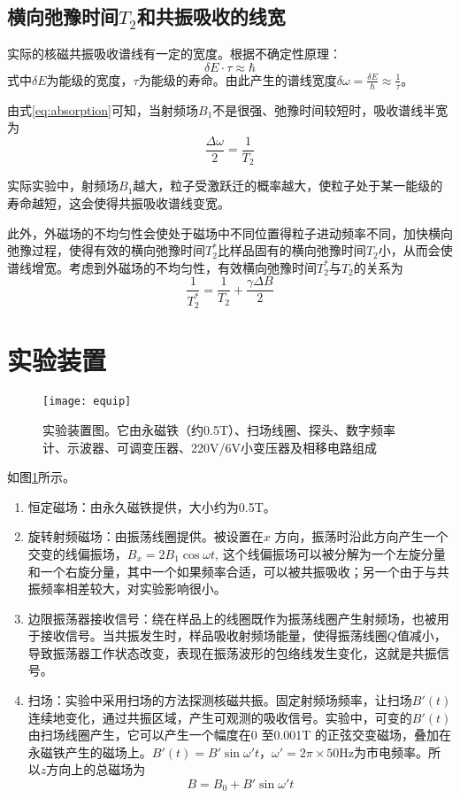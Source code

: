 \documentclass[aps,pre,12pt,preprint,onecolumn,showpacs,showkeys]{revtex4-1}
\begin{document}
\subsection{横向弛豫时间$T_2$和共振吸收的线宽}
实际的核磁共振吸收谱线有一定的宽度。根据不确定性原理：
$$\delta E \cdot \tau \approx \hbar$$
式中$\delta E$为能级的宽度，$\tau$为能级的寿命。由此产生的谱线宽度$\delta \omega=\frac{\delta E}{\hbar}\approx \frac{1}{\tau}$。

由式\ref{eq:absorption}可知，当射频场$B_1$不是很强、弛豫时间较短时，吸收谱线半宽为
\begin{equation}
\frac{\Delta \omega}{2}=\frac{1}{T_2}
\end{equation}

实际实验中，射频场$B_1$越大，粒子受激跃迁的概率越大，使粒子处于某一能级的寿命越短，这会使得共振吸收谱线变宽。

此外，外磁场的不均匀性会使处于磁场中不同位置得粒子进动频率不同，加快横向弛豫过程，使得有效的横向弛豫时间$T_2^*$比样品固有的横向弛豫时间$T_2$小，从而会使谱线增宽。考虑到外磁场的不均匀性，有效横向弛豫时间$T_2^*$与$T_2$的关系为
\begin{equation}
\frac{1}{T_2^*}=\frac{1}{T_2}+\frac{\gamma \Delta B}{2}\label{eq:effectiveT2}
\end{equation}

\section{实验装置}
\begin{figure}[h]
\centering
\texttt{[image: equip]}
\caption{\label{fig:equip}%
实验装置图。它由永磁铁（约0.5T）、扫场线圈、探头、数字频率计、示波器、可调变压器、220V/6V小变压器及相移电路组成}
\end{figure}
如图\ref{fig:equip}所示。
\begin{enumerate}
\item 恒定磁场：由永久磁铁提供，大小约为0.5T。
\item 旋转射频磁场：由振荡线圈提供。被设置在$x$ 方向，振荡时沿此方向产生一个交变的线偏振场，$B_x = 2B_1\cos \omega t$, 这个线偏振场可以被分解为一个左旋分量和一个右旋分量，其中一个如果频率合适，可以被共振吸收；另一个由于与共振频率相差较大，对实验影响很小。
\item 边限振荡器接收信号：绕在样品上的线圈既作为振荡线圈产生射频场，也被用于接收信号。当共振发生时，样品吸收射频场能量，使得振荡线圈$Q$值减小，导致振荡器工作状态改变，表现在振荡波形的包络线发生变化，这就是共振信号。
\item 扫场：实验中采用扫场的方法探测核磁共振。固定射频场频率，让扫场$B'(t)$ 连续地变化，通过共振区域，产生可观测的吸收信号。实验中，可变的$B'(t)$ 由扫场线圈产生，它可以产生一个幅度在0 至0.001T 的正弦交变磁场，叠加在永磁铁产生的磁场上。$B'(t)=B' \sin \omega' t$，$\omega'=2\pi \times 50\mathrm{Hz}$为市电频率。所以$z$方向上的总磁场为
\begin{equation}
B=B_0+B'\sin \omega' t\label{eq:magnet}
\end{equation}

\end{enumerate}
\end{document}
